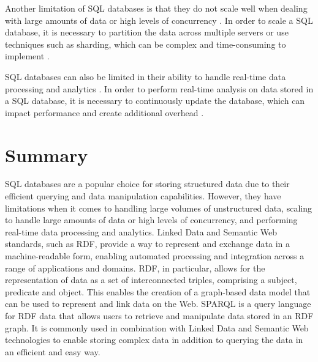 Another limitation of SQL databases is that they do not scale well when dealing with large amounts of data or high levels of concurrency \citep*{kleppmann2019designing,chen2014data}.  In order to scale a SQL database, it is necessary to partition the data across multiple servers or use techniques such as sharding, which can be complex and time-consuming to implement \citep*{ramez2016fundamentals}.

SQL databases can also be limited in their ability to handle real-time data processing and analytics \citep*{kleppmann2019designing,chen2014data}.  In order to perform real-time analysis on data stored in a SQL database, it is necessary to continuously update the database, which can impact performance and create additional overhead \citep*{garcia2008database}.

\section{Summary}

SQL databases are a popular choice for storing structured data due to their efficient querying and data manipulation capabilities.  However, they have limitations when it comes to handling large volumes of unstructured data, scaling to handle large amounts of data or high levels of concurrency, and performing real-time data processing and analytics.  Linked Data and Semantic Web standards, such as RDF, provide a way to represent and exchange data in a machine-readable form, enabling automated processing and integration across a range of applications and domains.  RDF, in particular, allows for the representation of data as a set of interconnected triples, comprising a subject, predicate and object.  This enables the creation of a graph-based data model that can be used to represent and link data on the Web.  SPARQL is a query language for RDF data that allows users to retrieve and manipulate data stored in an RDF graph.  It is commonly used in combination with Linked Data and Semantic Web technologies to enable storing complex data in addition to querying the data in an efficient and easy way.

